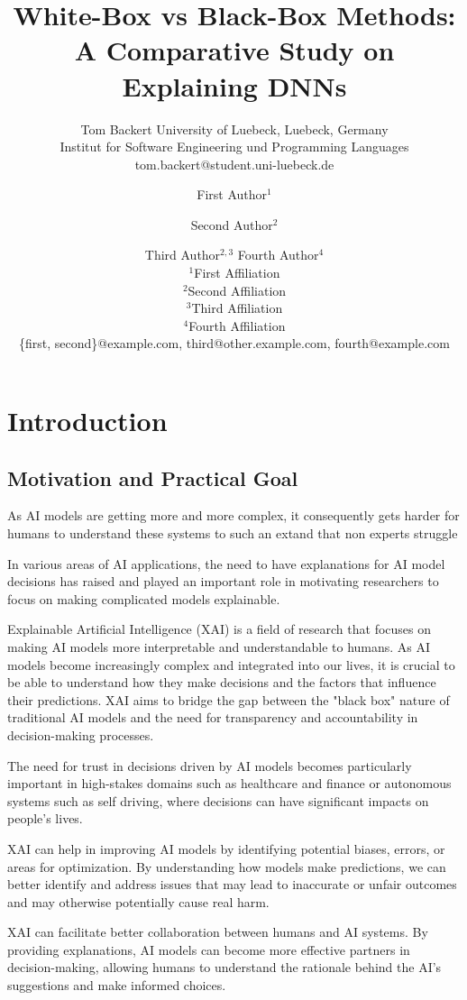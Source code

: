 \documentclass{article}
\title{White-Box vs Black-Box Methods: A Comparative Study on Explaining DNNs}
\author{
    Tom Backert
    \affiliations
    University of Luebeck, Luebeck, Germany\\
    Institut for Software Engineering und Programming Languages
    \emails
    tom.backert@student.uni-luebeck.de
}
\author{
First Author$^1$
\and
Second Author$^2$\and
Third Author$^{2,3}$\And
Fourth Author$^4$\\
\affiliations
$^1$First Affiliation\\
$^2$Second Affiliation\\
$^3$Third Affiliation\\
$^4$Fourth Affiliation\\
\emails
\{first, second\}@example.com,
third@other.example.com,
fourth@example.com
}
\begin{document}
\maketitle

\begin{abstract}
    
\end{abstract}

\section{Introduction}
\subsection{Motivation and Practical Goal}
As AI models are getting more and more complex, it consequently gets harder for humans to understand these systems to such an extand that non experts struggle  

In various areas of AI applications, the need to have explanations for AI model decisions has raised and played an important role in motivating researchers to focus on making complicated models explainable.

Explainable Artificial Intelligence (XAI) is a field of research that focuses on making AI models more interpretable and understandable to humans. As AI models become increasingly complex and integrated into our lives, it is crucial to be able to understand how they make decisions and the factors that influence their predictions. XAI aims to bridge the gap between the "black box" nature of traditional AI models and the need for transparency and accountability in decision-making processes. 

The need for trust in decisions driven by AI models becomes particularly important in high-stakes domains such as healthcare and finance or autonomous systems such as self driving, where decisions can have significant impacts on people's lives.

XAI can help in improving AI models by identifying potential biases, errors, or areas for optimization. By understanding how models make predictions, we can better identify and address issues that may lead to inaccurate or unfair outcomes and may otherwise potentially cause real harm.

XAI can facilitate better collaboration between humans and AI systems. By providing explanations, AI models can become more effective partners in decision-making, allowing humans to understand the rationale behind the AI's suggestions and make informed choices.
\end{document}
